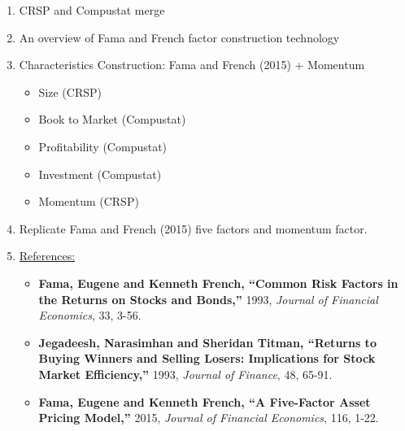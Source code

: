 \documentclass[12pts]{article}
\begin{document}
\begin{enumerate}
	\item CRSP and Compustat merge
	\item An overview of Fama and French factor construction technology
	\item Characteristics Construction: Fama and French (2015) + Momentum
	\begin{itemize}
		\item Size (CRSP)
		\item Book to Market (Compustat)
		\item Profitability (Compustat)
		\item Investment (Compustat)
		\item Momentum (CRSP)
	\end{itemize}
	\item Replicate Fama and French (2015) five factors and momentum factor.
	\item[] \hspace{-15 pt} \underline{References:}
	\begin{itemize}
		\item \textbf{Fama, Eugene and Kenneth French, “Common Risk Factors in the Returns on Stocks and Bonds,”} 1993, \textit{Journal of Financial Economics}, 33, 3-56.
		\item \textbf{Jegadeesh, Narasimhan and Sheridan Titman, “Returns to Buying Winners and Selling Losers: Implications for Stock Market Efficiency,”} 1993, \textit{Journal of Finance}, 48, 65-91.
		\item \textbf{Fama, Eugene and Kenneth French, “A Five-Factor Asset Pricing Model,”} 2015, \textit{Journal of Financial Economics}, 116, 1-22.
	\end{itemize}
\end{enumerate}
\end{document}
